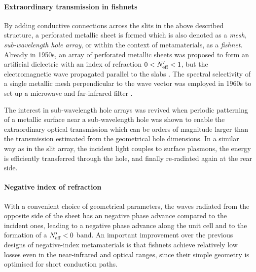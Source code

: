 \paragraph{Extraordinary transmission in fishnets} %
By adding conductive connections across the slits in the above described structure, a perforated metallic sheet is formed which is also denoted as a \textit{mesh}, \textit{sub-wavelength hole array}, or within the context of metamaterials, as a \textit{fishnet}. Already in 1950s, an array of perforated metallic sheets was proposed to form an artificial dielectric with an index of refraction $0 < N_{\text{eff} }' < 1$, but the electromagnetic wave propagated parallel to the slabs \cite[p. 58]{brown1953artificial}.  %
The spectral selectivity of a single metallic mesh perpendicular to the wave vector was employed in 1960s to set up a microwave and far-infrared filter \cite{ulrich1967effective,ulrich1967far, vogel1964transmission}.  

The interest in sub-wavelength hole arrays was revived when periodic patterning of a metallic surface near a sub-wavelength hole was shown  \cite{ebbesen1998extraordinary} to enable the extraordinary optical transmission which can be orders of magnitude larger than the transmission estimated from the geometrical hole dimensions. 
In a similar way as in the slit array, the incident light couples to surface plasmons, the energy is efficiently transferred through the hole, and finally re-radiated again at the rear side. 


\paragraph{Negative index of refraction}%
With a convenient choice of geometrical parameters, the waves radiated from the opposite side of the sheet has an negative phase advance compared to the incident ones, leading to a negative phase advance along the unit cell and to the formation of a $N_{\text{eff} }'<0$ band. 
An important improvement over the previous designs of negative-index metamaterials is that fishnets achieve relatively low losses even in the near-infrared and optical ranges, since their simple geometry is optimised for short conduction paths.

